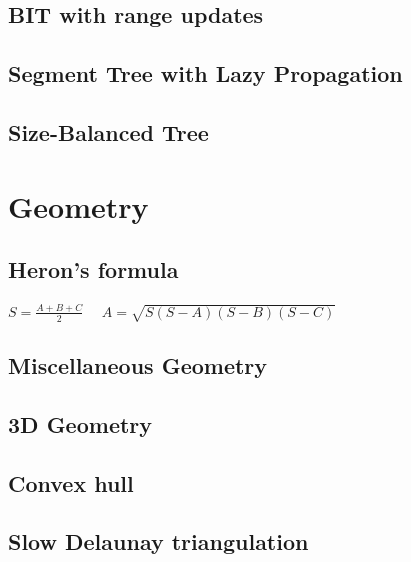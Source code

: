 \documentclass[9pt]{extarticle}
\begin{document}
\begin{multicols*}{3}
\subsection{BIT with range updates} %


\subsection{Segment Tree with Lazy Propagation} %


\subsection{Size-Balanced Tree}


\section{Geometry}

\subsection{Heron's formula}
$S = \frac{A+B+C}{2} \quad$
$A = \sqrt{S(S-A)(S-B)(S-C)}$

\subsection{Miscellaneous Geometry} %


\subsection{3D Geometry}


\subsection{Convex hull} %


\subsection{Slow Delaunay triangulation} %



\end{multicols*}
\end{document}
